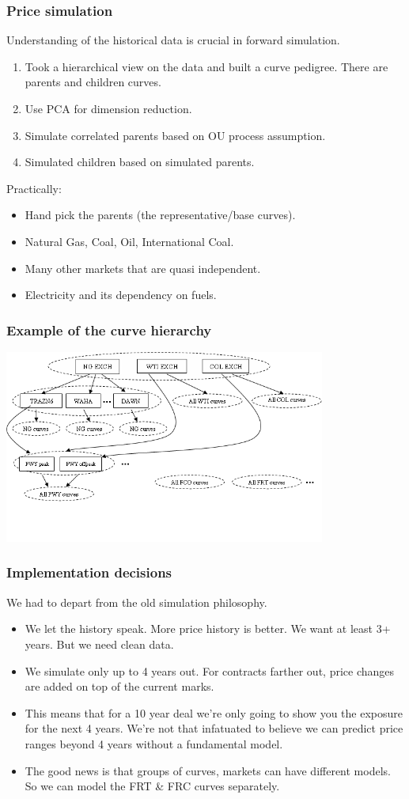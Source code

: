 \documentclass[10pt]{beamer}
\begin{document}
\frame 
{
  \frametitle{Price simulation}
Understanding of the historical data is crucial in forward
simulation.  
\begin{enumerate}
\item Took a hierarchical view on the data and built a curve pedigree. 
There are parents and children curves.
\item Use PCA for dimension reduction.
\item Simulate correlated parents based on OU process assumption.
\item Simulated children based on simulated parents.
\end{enumerate}

Practically:
\begin{itemize}
\item Hand pick the parents (the representative/base curves).  
\item Natural Gas, Coal, Oil, International Coal.
\item Many other markets that are quasi independent.  
\item Electricity and its dependency on fuels.
\end{itemize}
}

\frame
{
  \frametitle{Example of the curve hierarchy} 
\begin{center}
  \includegraphics[height=2.5in]{figures/pedigree.png}
\end{center}
}

\frame 
{
  \frametitle{Implementation decisions}
We had to depart from the old simulation philosophy.
\begin{itemize}
\item We let the history speak.  More price history is better.  We
  want at least 3+ years.  But we need clean data. 
\item We simulate only up to 4 years out.  For contracts farther out,
  price changes are added on top of the current marks. 
\item This means that for a 10 year deal we're only going to show you
  the exposure for the next 4 years.  We're not that infatuated
  to believe we can predict price ranges beyond 4 years without a
  fundamental model.  
\item The good news is that groups of curves, markets can have
  different models.  So we can model the FRT \& FRC curves separately. 
\end{itemize}
}
\end{document}
